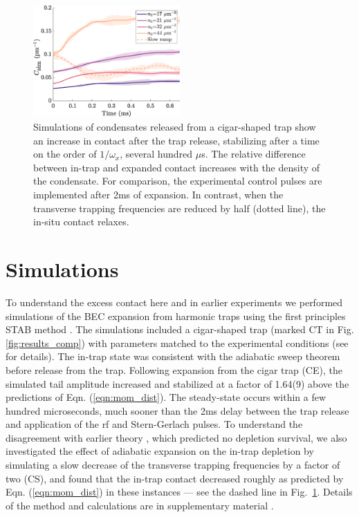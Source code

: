 	\begin{figure}[b]
	        \includegraphics[width=0.5\textwidth]{fig/QD/time_dep_theory}
	        \caption{Simulations of condensates released from a cigar-shaped trap show an increase in contact after the trap release, stabilizing after a time on the order of $1/\omega_x$, several hundred $\mu$s. The relative difference between in-trap and expanded contact increases with the density of the condensate. For comparison, the experimental control pulses are implemented after 2ms of expansion. In contrast, when the transverse trapping frequencies are reduced by half (dotted line), the in-situ contact relaxes.}
	        \label{fig:theory_time_dep}
	\end{figure}

	\section{Simulations} To understand the excess contact here and in earlier experiments \cite{chang16}  
	we performed simulations of the BEC expansion from harmonic traps using the first principles STAB method \cite{Deuar11,Kheruntsyan12}. The simulations included a cigar-shaped trap (marked CT in Fig. \ref{fig:results_comp}) with parameters matched to the experimental conditions (see \cite{SOM} for details). The in-trap state was consistent with the adiabatic sweep theorem before release from the trap. Following expansion from the cigar trap (CE), the simulated tail amplitude increased and stabilized at a factor of 1.64(9) above the predictions of Eqn. (\ref{eqn:mom_dist}). The steady-state occurs within a few hundred microseconds, much sooner than the 2ms delay between the trap release and application of the rf and Stern-Gerlach pulses. To understand the disagreement with earlier theory \cite{qu16}, which predicted no depletion survival, we also investigated the effect of adiabatic expansion on the in-trap depletion by simulating a slow decrease of the transverse trapping frequencies by a factor of two (CS), and found that the in-trap contact decreased roughly as predicted by Eqn. (\ref{eqn:mom_dist}) in these instances --- see the dashed line in Fig.~\ref{fig:theory_time_dep}. Details of the method and calculations are in supplementary material \cite{SOM}. 


